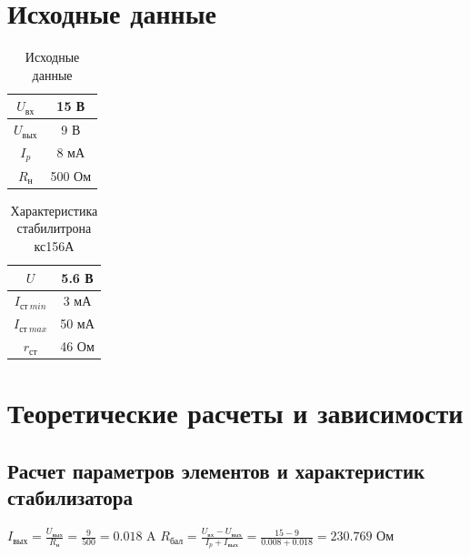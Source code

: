 \section{Исходные данные}

\begin{table}[H]
	\begin{center}
	\caption{Исходные данные}
	\def\arraystretch{1.2}
		\begin{tabular}{|c|c|}
		\hline 
		$U_\text{вх}$ & 15 В \\ 
		\hline 
		$U_\text{вых}$ & 9 В \\ 
		\hline 
		$I_p$ & 8 мА \\ 
		\hline 
		$R_\text{н}$ & 500 Ом \\ 
		\hline 
		\end{tabular} 
		\label{tab:3:1}
	\end{center}
\end{table}

\begin{table}[H]
	\begin{center}
	\caption{Характеристика стабилитрона кс156А}
	\def\arraystretch{1.2}
		\begin{tabular}{|c|c|}
		\hline 
		$U$ & 5.6 В \\ 
		\hline 
		$I_{\text{ст}\ min}$ & 3 мА \\ 
		\hline 
		$I_{\text{ст}\ max}$ & 50 мА \\ 
		\hline 
		$r_{\text{ст}}$ & 46 Ом \\ 
		\hline 
		\end{tabular} 
		\label{tab:3:2}
	\end{center}
\end{table}


\section{Теоретические расчеты и зависимости}

\subsection{Расчет параметров элементов и характеристик стабилизатора}
$I_\text{вых} = \frac{U_\text{вых}}{R_\text{н}} = \frac{9}{500} = 0.018$ A
$R_\text{бал} = \frac{U_\text{вх} - U_\text{вых}}{I_p + I_\text{вых}} = \frac{15 - 9}{0.008 + 0.018} = 230.769$ Ом

